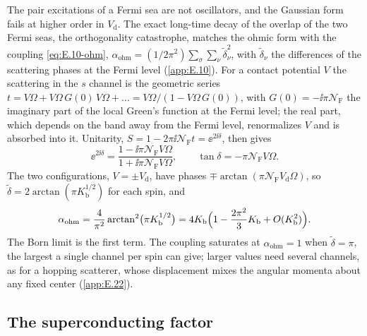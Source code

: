 The pair excitations of a Fermi sea are not oscillators, and the Gaussian form fails at higher order in $V_{\mathrm{d}}$. The exact long-time decay of the overlap of the two Fermi seas, the orthogonality catastrophe, matches the ohmic form with the coupling \cref{eq:E.10-ohm}, $\alpha_{\mathrm{ohm}} = (1/2\pi^2)\sum_\sigma\sum_\nu\tilde\delta_\nu^2$, with $\tilde\delta_\nu$ the differences of the scattering phases at the Fermi level (\cref{app:E.10}). For a contact potential $V$ the scattering in the $s$ channel is the geometric series $t = V\Omega + V\Omega\,G(0)\,V\Omega + \dots = V\Omega/(1 - V\Omega\,G(0))$, with $G(0) = -\ii\pi\mathcal{N}_{\mathrm{F}}$ the imaginary part of the local Green's function at the Fermi level; the real part, which depends on the band away from the Fermi level, renormalizes $V$ and is absorbed into it. Unitarity, $S = 1 - 2\pi\ii\mathcal{N}_{\mathrm{F}}t = \ee^{2\ii\delta}$, then gives
\begin{equation*}
  \ee^{2\ii\delta} = \frac{1 - \ii\pi\mathcal{N}_{\mathrm{F}}V\Omega}{1 + \ii\pi\mathcal{N}_{\mathrm{F}}V\Omega} , \qquad \tan\delta = -\pi\mathcal{N}_{\mathrm{F}}V\Omega .
\end{equation*}
The two configurations, $V = \pm V_{\mathrm{d}}$, have phases $\mp\arctan(\pi\mathcal{N}_{\mathrm{F}}V_{\mathrm{d}}\Omega)$, so $\tilde\delta = 2\arctan(\pi K_{\mathrm{b}}^{1/2})$ for each spin, and
\begin{equation}
  \alpha_{\mathrm{ohm}} = \frac{4}{\pi^2}\arctan^2\bigl(\pi K_{\mathrm{b}}^{1/2}\bigr) = 4K_{\mathrm{b}}\Bigl(1 - \frac{2\pi^2}{3}K_{\mathrm{b}} + O(K_{\mathrm{b}}^2)\Bigr) .
  \label{eq:D.42-alpha}
\end{equation}
The Born limit is the first term. The coupling saturates at $\alpha_{\mathrm{ohm}} = 1$ when $\tilde\delta = \pi$, the largest a single channel per spin can give; larger values need several channels, as for a hopping scatterer, whose displacement mixes the angular momenta about any fixed center (\cref{app:E.22}).

\subsection*{The superconducting factor}

